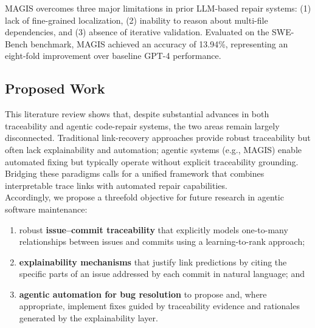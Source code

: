 MAGIS overcomes three major limitations in prior LLM-based repair systems:
(1) lack of fine-grained localization,  
(2) inability to reason about multi-file dependencies, and  
(3) absence of iterative validation.  
Evaluated on the SWE-Bench benchmark, MAGIS achieved an accuracy of 13.94\%, representing an eight-fold improvement over baseline GPT-4 performance.



\subsection{Proposed Work}
This literature review shows that, despite substantial advances in both traceability and agentic code-repair systems, the two areas remain largely disconnected. Traditional link-recovery approaches provide robust traceability but often lack explainability and automation; agentic systems (e.g., MAGIS) enable automated fixing but typically operate without explicit traceability grounding. Bridging these paradigms calls for a unified framework that combines interpretable trace links with automated repair capabilities.\\Accordingly, we propose a threefold objective for future research in agentic software maintenance:
\begin{enumerate}
    \item robust \textbf{issue--commit traceability} that explicitly models one-to-many relationships between issues and commits using a learning-to-rank approach;
    \item \textbf{explainability mechanisms} that justify link predictions by citing the specific parts of an issue addressed by each commit in natural language; and
    \item \textbf{agentic automation for bug resolution} to propose and, where appropriate, implement fixes guided by traceability evidence and rationales generated by the explainability layer.
\end{enumerate}
\begin{center}
\begingroup
\setlength{\fboxsep}{6pt}%
\endgroup
\end{center}
